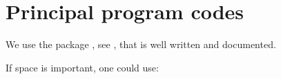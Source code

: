 \chapter{Principal program codes}\label{ch:CODES}

\lstset{language=Python}

We use the package  , see \cite{listingCite}, that is well written and documented.

If space is important, one could use:\\
\verb++





